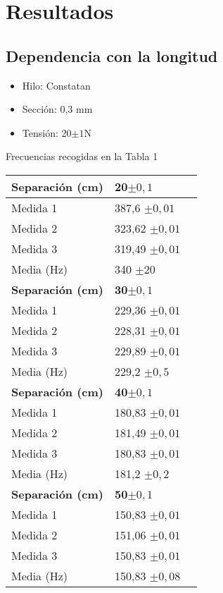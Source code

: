 \documentclass[a4paper,12pt,spanish]{article}
\begin{document}
\section{Resultados}

\subsection{ Dependencia con la longitud }
\begin{itemize}
	\item{Hilo: Constatan}
	\item{Sección: 0,3 mm}
	\item{Tensión: 20$\pm 1$N}
\end{itemize}

Frecuencias recogidas en la Tabla 1


\begin{table}[H]
	\begin{minipage}[t]{.48\linewidth}
		\centering
		\begin{tabular}{|l|l|l|}
			\hline
			\textbf{Separación (cm)} & \textbf{20$\pm 0,1$ } \\ \hline 
			Medida 1             & 387,6  $\pm 0,01$   \\ \hline
			Medida 2             & 323,62 $\pm 0,01$    \\ \hline
			Medida 3             & 319,49 $\pm 0,01$    \\ \hline
			Media  (Hz)               & 340 $\pm 20$    \\ \hline\hline
			\textbf{Separación (cm)} & \textbf{30$\pm 0,1$} \\ \hline
			Medida 1             & 229,36 $\pm 0,01$    \\ \hline
			Medida 2            & 228,31 $\pm 0,01$    \\ \hline
			Medida 3             & 229,89 $\pm 0,01$    \\ \hline
			Media  (Hz)               & 229,2 $\pm 0,5$    \\ \hline\hline
			\textbf{Separación (cm)} & \textbf{40$\pm 0,1$} \\ \hline
			Medida 1             & 180,83 $\pm 0,01$    \\ \hline
			Medida 2             & 181,49 $\pm 0,01$   \\ \hline
			Medida 3             & 180,83 $\pm 0,01$    \\ \hline
			Media  (Hz)               & 181,2 $\pm 0,2$     \\ \hline\hline
			\textbf{Separación (cm)} & \textbf{50$\pm 0,1$} \\ \hline
			Medida 1            & 150,83 $\pm 0,01$    \\ \hline
			Medida 2            & 151,06  $\pm 0,01$   \\ \hline
			Medida 3             & 150,83 $\pm 0,01$    \\ \hline
			Media    (Hz)             & 150,83 $\pm 0,08$     \\ \hline
		\end{tabular}
		

\end{minipage}
\end{table}
\end{document}
